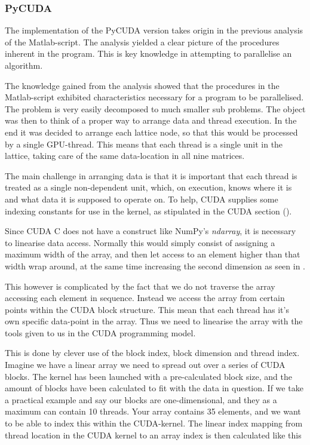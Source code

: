 \subsubsection{PyCUDA}
The implementation of the PyCUDA version takes origin in the previous analysis of the Matlab-script. The analysis yielded a clear picture of the procedures inherent in the program. This is key knowledge in attempting to parallelise an algorithm.

The knowledge gained from the analysis showed that the procedures in the Matlab-script exhibited characteristics necessary for a program to be parallelised. The problem is very easily decomposed to much smaller sub problems. The object was then to think of a proper way to arrange data and thread execution. In the end it was decided to arrange each lattice node, so that this would be processed by a single GPU-thread. This means that each thread is a single unit in the lattice, taking care of the same data-location in all nine matrices.

The main challenge in arranging data is that it is important that each thread is treated as a single non-dependent unit, which, on execution, knows where it is and what data it is supposed to operate on. To help, CUDA supplies some indexing constants for use in the kernel, as stipulated in the CUDA section ().

Since CUDA C does not have a construct like NumPy's \textit{ndarray}, it is necessary to linearise data access. Normally this would simply consist of assigning a maximum width of the array, and then let access to an element higher than that width wrap around, at the same time increasing the second dimension as seen in .


This however is complicated by the fact that we do not traverse the array accessing each element in sequence. Instead we access the array from certain points within the CUDA block structure. This mean that each thread has it's own specific data-point in the array. Thus we need to linearise the array with the tools given to us in the CUDA programming model.

This is done by clever use of the block index, block dimension and thread index. Imagine we have a linear array we need to spread out over a series of CUDA blocks. The kernel has been launched with a pre-calculated block size, and the amount of blocks have been calculated to fit with the data in question. If we take a practical example and say our blocks are one-dimensional, and they as a maximum can contain 10 threads. Your array contains 35 elements, and we want to be able to index this within the CUDA-kernel. The linear index mapping from thread location in the CUDA kernel to an array index is then calculated like this

